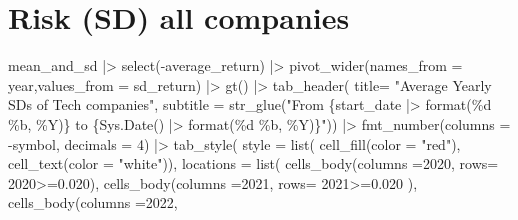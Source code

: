 \documentclass[
  letterpaper,
  DIV=11,
  numbers=noendperiod]{scrreprt}
\newenvironment{Shaded}{\begin{snugshade}}{\end{snugshade}}
\newcommand{\AttributeTok}[1]{\textcolor[rgb]{0.40,0.45,0.13}{#1}}
\newcommand{\DecValTok}[1]{\textcolor[rgb]{0.68,0.00,0.00}{#1}}
\newcommand{\FloatTok}[1]{\textcolor[rgb]{0.68,0.00,0.00}{#1}}
\newcommand{\FunctionTok}[1]{\textcolor[rgb]{0.28,0.35,0.67}{#1}}
\newcommand{\NormalTok}[1]{\textcolor[rgb]{0.00,0.23,0.31}{#1}}
\newcommand{\SpecialCharTok}[1]{\textcolor[rgb]{0.37,0.37,0.37}{#1}}
\newcommand{\StringTok}[1]{\textcolor[rgb]{0.13,0.47,0.30}{#1}}
\theoremstyle{definition}
\theoremstyle{remark}
\begin{document}
\begin{longtable}{lrrrrr}
\end{longtable}

\section{Risk (SD) all companies}\label{risk-sd-all-companies}

\begin{Shaded}
\begin{Highlighting}[]
\NormalTok{mean\_and\_sd }\SpecialCharTok{|\textgreater{}} 
  \FunctionTok{select}\NormalTok{(}\SpecialCharTok{{-}}\NormalTok{average\_return) }\SpecialCharTok{|\textgreater{}} 
  \FunctionTok{pivot\_wider}\NormalTok{(}\AttributeTok{names\_from =}\NormalTok{ year,}\AttributeTok{values\_from =}\NormalTok{ sd\_return) }\SpecialCharTok{|\textgreater{}} 
  \FunctionTok{gt}\NormalTok{() }\SpecialCharTok{|\textgreater{}} 
  \FunctionTok{tab\_header}\NormalTok{(}
    \AttributeTok{title=} \StringTok{"Average Yearly SDs of Tech companies"}\NormalTok{,}
    \AttributeTok{subtitle  =} \FunctionTok{str\_glue}\NormalTok{(}\StringTok{"From \{start\_date |\textgreater{} format(\textquotesingle{}\%d \%b, \%Y\textquotesingle{})\} to \{Sys.Date() |\textgreater{} format(\textquotesingle{}\%d \%b, \%Y\textquotesingle{})\}"}\NormalTok{)) }\SpecialCharTok{|\textgreater{}} 
  \FunctionTok{fmt\_number}\NormalTok{(}\AttributeTok{columns =} \SpecialCharTok{{-}}\NormalTok{symbol, }\AttributeTok{decimals  =} \DecValTok{4}\NormalTok{) }\SpecialCharTok{|\textgreater{}} 
  \FunctionTok{tab\_style}\NormalTok{(}
    \AttributeTok{style =} \FunctionTok{list}\NormalTok{(}
      \FunctionTok{cell\_fill}\NormalTok{(}\AttributeTok{color =} \StringTok{"red"}\NormalTok{), }
      \FunctionTok{cell\_text}\NormalTok{(}\AttributeTok{color =} \StringTok{"white"}\NormalTok{)), }
        \AttributeTok{locations =} \FunctionTok{list}\NormalTok{(}
      \FunctionTok{cells\_body}\NormalTok{(}\AttributeTok{columns =}\StringTok{\textasciigrave{}}\AttributeTok{2020}\StringTok{\textasciigrave{}}\NormalTok{, }
                 \AttributeTok{rows=} \StringTok{\textasciigrave{}}\AttributeTok{2020}\StringTok{\textasciigrave{}}\SpecialCharTok{\textgreater{}=}\FloatTok{0.020}\NormalTok{), }
      \FunctionTok{cells\_body}\NormalTok{(}\AttributeTok{columns =}\StringTok{\textasciigrave{}}\AttributeTok{2021}\StringTok{\textasciigrave{}}\NormalTok{, }
                 \AttributeTok{rows=} \StringTok{\textasciigrave{}}\AttributeTok{2021}\StringTok{\textasciigrave{}}\SpecialCharTok{\textgreater{}=}\FloatTok{0.020}\NormalTok{ ), }
       \FunctionTok{cells\_body}\NormalTok{(}\AttributeTok{columns =}\StringTok{\textasciigrave{}}\AttributeTok{2022}\StringTok{\textasciigrave{}}\NormalTok{, }

\end{Highlighting}
\end{Shaded}
\end{document}
